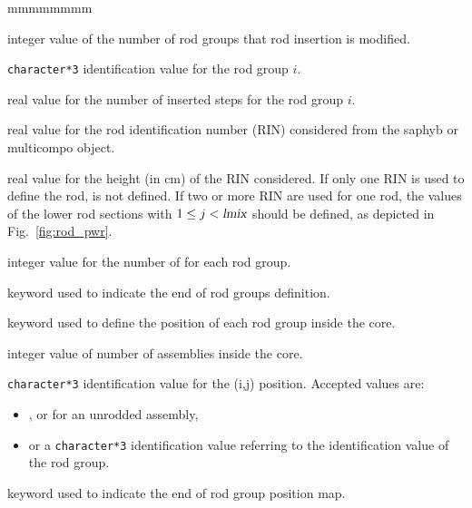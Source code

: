 \begin{ListeDeDescription}{mmmmmmmm}
\item[\dusa{nrmv}] integer value of the number of rod groups that rod insertion is modified.

\item[\dusa{hgrp}] \texttt{character*3} identification value for the rod group $i$.

\item[\dusa{isrt}] real value for the number of inserted steps for the rod group $i$.

\item[\dusa{rin}] real value for the rod identification number (RIN) considered from the {\sc saphyb} or {\sc multicompo} object.

\item[\dusa{hmix}] real value for the height (in cm) of the RIN considered.
If only one RIN is used to define the rod,  is not defined. If two or more RIN are used for one rod, 
the values of the lower rod sections with $1\le j < \dusa{lmix}$ should be defined, as depicted in Fig.~\ref{fig:rod_pwr}.

\item[\dusa{lmix}] integer value for the number of  for each rod group.

\item[\moc{ENDRGRP}] keyword used to indicate the end of rod groups definition.

\item[\moc{RMAP}] keyword used to define the position of each rod group inside the core.

\item[\dusa{nass}] integer value of number of assemblies inside the core.

\item[\dusa{hrod}] \texttt{character*3} identification value for the (i,j) position. Accepted
values are:
\begin{itemize}
\item \moc{|}, \moc{-} or \moc{-|-} for an unrodded assembly,
\item or a \texttt{character*3} identification value referring to the identification value of the rod group.
\end{itemize}

\item[\moc{ENDRMAP}] keyword used to indicate the end of rod group position map.

\end{ListeDeDescription}

\eject
